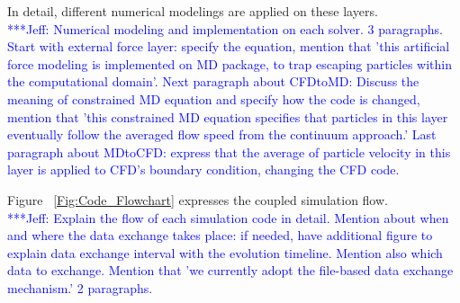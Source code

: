\documentclass[conference,final]{IEEEtran}
\newcommand{\skonote}[1]{ {\textcolor{blue} { ***Jeff: #1 }}}
\newcommand{\skonote}[1]{}
\begin{document}
In detail, different numerical modelings are applied on these layers.\\
\skonote{Numerical modeling and implementation on each solver. 3 paragraphs. Start with external force layer: specify the equation, mention that 'this artificial force modeling is implemented on MD package, to trap escaping particles within the computational domain'. Next paragraph about CFDtoMD: Discuss the meaning of constrained MD equation and specify how the code is changed, mention that 'this constrained MD equation specifies that particles in this layer eventually follow the averaged flow speed from the continuum approach.' Last paragraph about MDtoCFD: express that the average of particle velocity in this layer is applied to CFD's boundary condition, changing the CFD code.}
\newline
\newline


Figure ~\ref{Fig:Code_Flowchart} expresses the coupled simulation flow.\\
\skonote{Explain the flow of each simulation code in detail. Mention about when and where the data exchange takes place: if needed, have additional figure to explain data exchange interval with the evolution timeline. Mention also which data to exchange. Mention that 'we currently adopt the file-based data exchange mechanism.' 2 paragraphs.}
\newline
\newline
\end{document}
